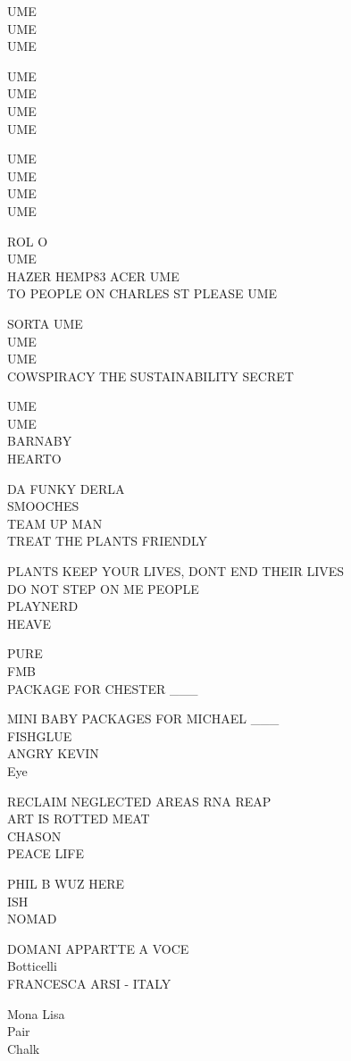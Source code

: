 \documentclass[10pt,letterpaper]{article}
\begin{document}
UME\\
UME\\
UME

UME\\
UME\\
UME\\
UME

UME\\
UME\\
UME\\
UME

ROL O\\
UME\\
HAZER HEMP83 ACER UME\\
TO PEOPLE ON CHARLES ST PLEASE UME

SORTA UME\\
UME\\
UME\\
COWSPIRACY THE SUSTAINABILITY SECRET

UME\\
UME\\
BARNABY\\
HEARTO

DA FUNKY DERLA\\
SMOOCHES\\
TEAM UP MAN\\
TREAT THE PLANTS FRIENDLY

PLANTS KEEP YOUR LIVES, DONT END THEIR LIVES\\
DO NOT STEP ON ME PEOPLE\\
PLAYNERD\\
HEAVE

PURE\\
FMB\\
PACKAGE FOR CHESTER \_\_\_

MINI BABY PACKAGES FOR MICHAEL \_\_\_\\
FISHGLUE\\
ANGRY KEVIN\\
Eye

RECLAIM NEGLECTED AREAS RNA REAP\\
ART IS ROTTED MEAT\\
CHASON\\
PEACE LIFE

PHIL B WUZ HERE\\
ISH\\
NOMAD

DOMANI APPARTTE A VOCE\\
Botticelli\\
FRANCESCA ARSI {-} ITALY

Mona Lisa\\
Pair\\
Chalk
\end{document}
